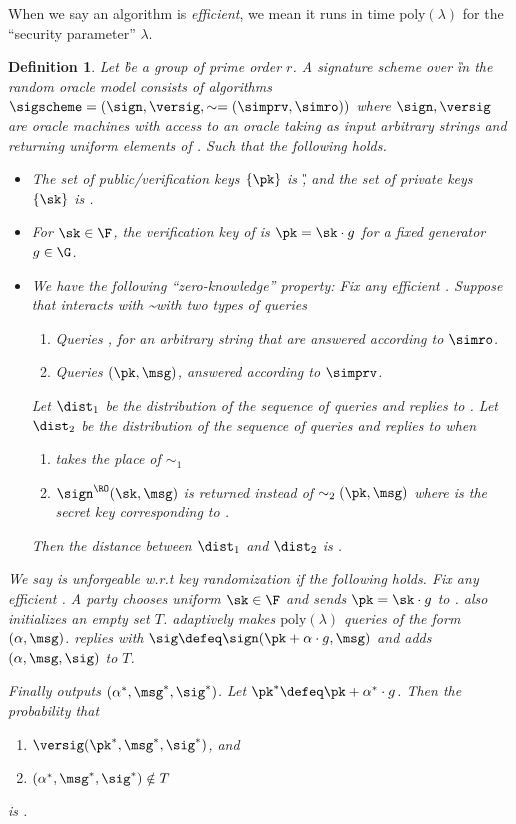 \documentclass[11pt]{article}
\numberwithin{equation}{section} %
\numberwithin{figure}{section} %
\newtheorem{dfn}[thm]{Definition}
\newcommand{\set}[1]{\ensuremath{\left\{#1\right\}}\xspace}
\newcommand{\poly}{\ensuremath{\mathrm{poly}(\lambda)}\xspace}
\begin{document}
When we say an algorithm \adv is \emph{efficient}, we mean it runs in time \poly for the ``security parameter'' $\lambda$.


 \begin{dfn}\label{dfn:sigscheme}
Let \G be a group of prime order $r$.
A signature scheme \sigscheme over \G in the random oracle model consists of algorithms $\sigscheme = (\sign,\versig,\sim= (\simprv,\simro))$
where $\sign,\versig$ are oracle machines with access to an oracle \RO taking as input arbitrary strings and returning uniform elements of \F.
Such that the following holds.
 \begin{itemize}
  \item The set of public/verification keys \set{\pk} is \G, and the set of private keys \set{\sk} is \F.
  \item For $\sk \in \F$, the verification key of \sk is $\pk= \sk\cdot g$ for a fixed generator $g\in \G$.
  \item We have the following ``zero-knowledge'' property:
 Fix any efficient \adv.
 Suppose that \adv interacts with \sim with two types of queries 
  \begin{enumerate}
   \item Queries \str, for an arbitrary string \str that are answered according to $\simro$.
   \item Queries $(\pk,\msg)$, answered according to $\simprv$.
  \end{enumerate}
Let $\dist_1$ be the distribution of the sequence of queries and replies to \adv.
Let $\dist_2$ be the distribution of the sequence of queries and replies to \adv when

\begin{enumerate}
 \item \RO takes the place of  $\sim_1$
 \item $\sign^{\RO}(\sk,\msg)$ is returned instead of $\sim_2(\pk,\msg)$ where \sk is the secret key corresponding to \pk.
\end{enumerate}
Then the distance between $\dist_1$ and $\dist_2$ is \negl.
\end{itemize}

We say \sigscheme is \emph{unforgeable w.r.t key randomization} if the following holds.
Fix any efficient \adv.
A party \oracle chooses uniform $\sk\in \F$ and sends $\pk = \sk\cdot g$ to \adv.
\oracle also initializes an empty set $T$.
\adv adaptively makes \poly queries of the form $(\alpha,\msg)$.
\oracle replies with $\sig\defeq \sign(\pk+\alpha\cdot g, \msg)$
and adds $(\alpha,\msg,\sig)$ to $T$.

Finally \adv outputs $(\alpha^*,\msg^*,\sig^*)$.
Let $\pk^*\defeq \pk+\alpha^*\cdot g$.
 Then the probability that 
  \begin{enumerate}
   \item $\versig(\pk^*,\msg^*,\sig^*)$, and 
   \item $(\alpha^*,\msg^*,\sig^*)\notin T$
  \end{enumerate}
is \negl.
\end{dfn}
\end{document}
